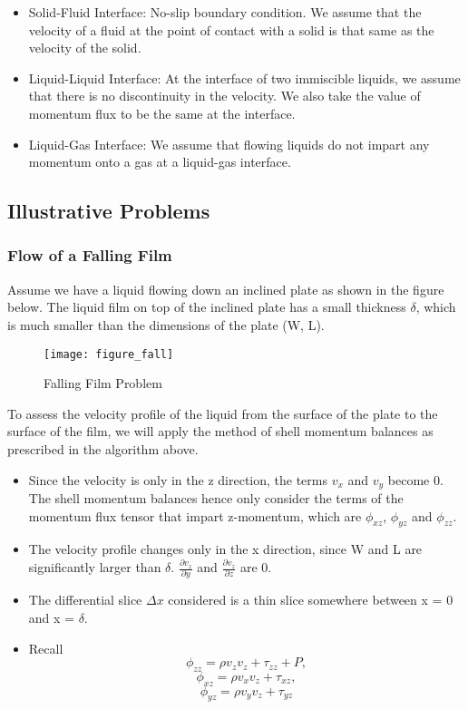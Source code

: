 \begin{itemize}

    \item Solid-Fluid Interface: No-slip boundary condition. We assume that the velocity of a fluid at the point of contact with a solid is that same as the velocity of the solid.

    \item Liquid-Liquid Interface: At the interface of two immiscible liquids, we assume that there is no discontinuity in the velocity. We also take the value of momentum flux to be the same at the interface.

    \item Liquid-Gas Interface: We assume that flowing liquids do not impart any momentum onto a gas at a liquid-gas interface.

\end{itemize}


\subsection{Illustrative Problems}

\subsubsection{Flow of a Falling Film}

Assume we have a liquid flowing down an inclined plate as shown in the figure below. The liquid film on top of the inclined plate has a small thickness $\delta$, which is much smaller than the dimensions of the plate (W, L). 

\begin{figure}[h]
    \centering
    \texttt{[image: figure\_fall]}
    \caption{Falling Film Problem}
\end{figure}

To assess the velocity profile of the liquid from the surface of the plate to the surface of the film, we will apply the method of shell momentum balances as prescribed in the algorithm above.


\begin{itemize}

    \item Since the velocity is only in the z direction, the terms $v_{x}$ and $v_{y}$ become 0. The shell momentum balances hence only consider the terms of the momentum flux tensor that impart z-momentum, which are $\phi_{xz}$, $\phi_{yz}$ and $\phi_{zz}$. 

    \item The velocity profile changes only in the x direction, since W and L are significantly larger than $\delta$. $\frac{\partial v_{z}}{\partial y}$ and $\frac{\partial v_{z}}{\partial z}$ are 0.

    \item The differential slice $\Delta x$ considered is a thin slice somewhere between x = 0 and x = $\delta$.

    \item Recall $$\phi_{zz} = \rho v_{z} v_{z} + \tau_{zz} + P ,$$ $$\phi_{xz} = \rho v_{x} v_{z} + \tau_{xz} ,$$ $$\phi_{yz} = \rho v_{y} v_{z} + \tau_{yz}$$
\end{itemize}

